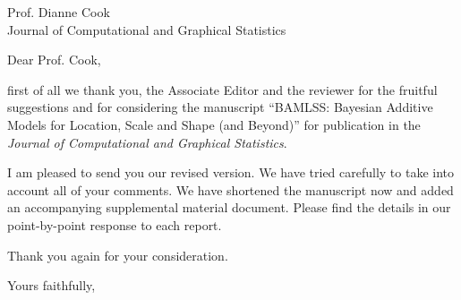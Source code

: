 \documentclass[foldmark,english]{uibkletter}
\begin{document}
\begin{letter}{Prof. Dianne Cook\\ Journal of Computational and Graphical Statistics}

\opening{Dear Prof. Cook,}

first of all we thank you, the Associate Editor and the reviewer for the fruitful suggestions
and for considering the manuscript ``BAMLSS: Bayesian Additive Models for
Location, Scale and Shape (and Beyond)'' for publication in the \emph{Journal of Computational and
Graphical Statistics}.

I am pleased to send you our revised version. We have tried carefully to take into account all of
your comments. We have shortened the manuscript now and added an accompanying supplemental
material document. Please find the details in our point-by-point response to each report.

Thank you again for your consideration.

\closing{Yours faithfully,}

\end{letter}
\end{document}
